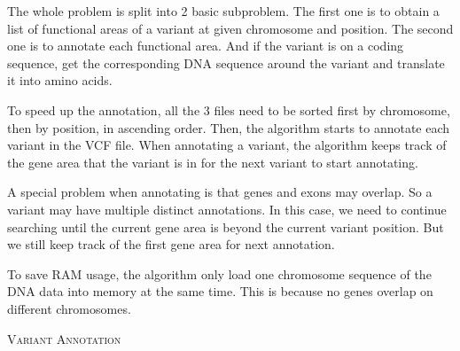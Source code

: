 \documentclass[onehalf,11pt]{beavtex}
\begin{document}
The whole problem is split into 2 basic subproblem. The first one is to obtain a list of functional areas of a variant at given chromosome and position. The second one is to annotate each functional area. And if the variant is on a coding sequence, get the corresponding DNA sequence around the variant and translate it into amino acids.

To speed up the annotation, all the 3 files need to be sorted first by chromosome, then by position, in ascending order. Then, the algorithm starts to annotate each variant in the VCF file. When annotating a variant, the algorithm keeps track of the gene area that the variant is in for the next variant to start annotating.

A special problem when annotating is that genes and exons may overlap. So a variant may have multiple distinct annotations. In this case, we need to continue searching until the current gene area is beyond the current variant position. But we still keep track of the first gene area for next annotation.

To save RAM usage, the algorithm only load one chromosome sequence of the DNA data into memory at the same time. This is because no genes overlap on different chromosomes.



\IncMargin{1em}
\begin{algorithm}[h!]
 \label{alg:ANN}
 \SetAlgoLined

     \BlankLine
 \caption{\textsc{Variant Annotation}}
\end{algorithm}\DecMargin{1em} 
\end{document}
